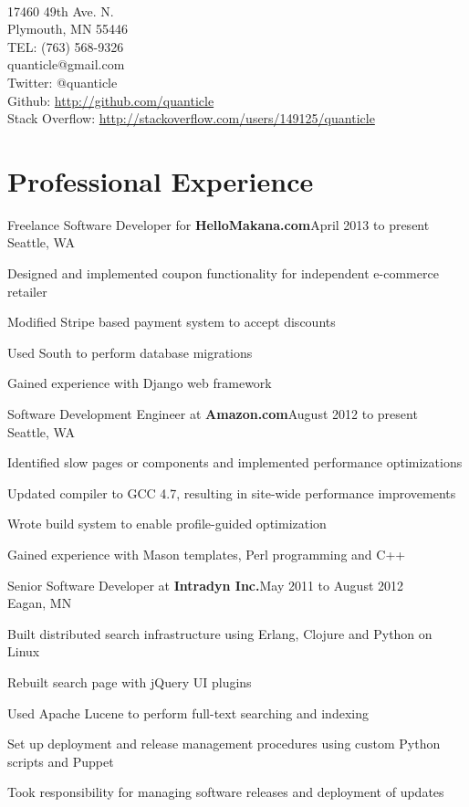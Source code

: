 \documentclass[letterpaper]{article}
\newenvironment{resume-list}
{\begin{itemize}
 \setlength{\itemsep}{0pt}
 \setlength{\parskip}{0pt}}
{\end{itemize}}
\begin{document}
\\
{\small 17460 49th Ave. N.}\\
{\small Plymouth, MN 55446}\\
{\small TEL: (763) 568-9326}\\
{\small quanticle@gmail.com}\\
{\small Twitter: @quanticle}\\
{\small Github: \url{http://github.com/quanticle}}\\
{\small Stack Overflow: \url{http://stackoverflow.com/users/149125/quanticle}}
\section*{Professional Experience}
\noindent Freelance Software Developer for {\bfseries HelloMakana.com}\dotfill April 2013 to present\\
Seattle, WA
\begin{resume-list}
\item Designed and implemented coupon functionality for independent e-commerce retailer
\item Modified Stripe based payment system to accept discounts
\item Used South to perform database migrations
\item Gained experience with Django web framework 
\end{resume-list}
\noindent Software Development Engineer at {\bfseries Amazon.com}\dotfill August 2012 to present\\
Seattle, WA
\begin{resume-list}
\item Identified slow pages or components and implemented performance optimizations
\item Updated compiler to GCC 4.7, resulting in site-wide performance improvements
\item Wrote build system to enable profile-guided optimization
\item Gained experience with Mason templates, Perl programming and C++ 
\end{resume-list}
\noindent Senior Software Developer at {\bfseries Intradyn Inc.}\dotfill May 2011 to August 2012\\
Eagan, MN
\begin{resume-list}
\item Built distributed search infrastructure using Erlang, Clojure and Python on Linux
\item Rebuilt search page with jQuery UI plugins
\item Used Apache Lucene to perform full-text searching and indexing
\item Set up deployment and release management procedures using custom Python scripts and Puppet
\item Took responsibility for managing software releases and deployment of updates
\end{resume-list}
\end{document}
